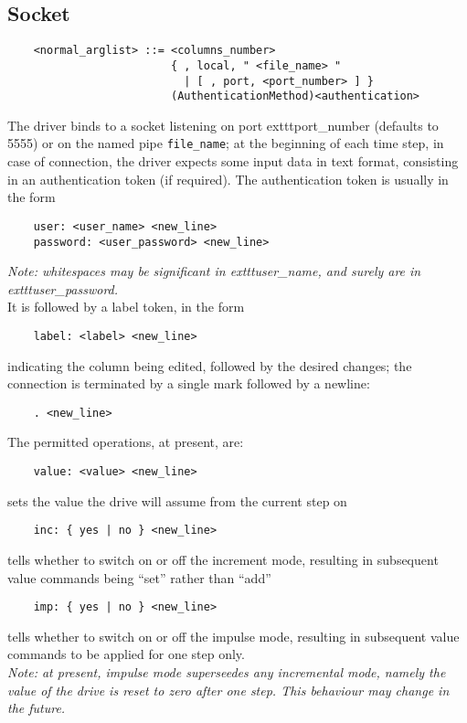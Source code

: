 \subsection{Socket}
\begin{verbatim}
    <normal_arglist> ::= <columns_number>
                         { , local, " <file_name> " 
                           | [ , port, <port_number> ] }
                         (AuthenticationMethod)<authentication>
\end{verbatim}
The driver binds to a socket listening on port 	exttt{port\_number} 
(defaults to 5555) or on the named pipe \texttt{file\_name}; at the
beginning of each time step, in case of connection, the driver expects some
input data in text format, consisting in an authentication token 
(if required).
The authentication token is usually in the form
\begin{verbatim}
    user: <user_name> <new_line>
    password: <user_password> <new_line>
\end{verbatim}
{\em 
    Note: whitespaces may be significant in 	exttt{user\_name}, and surely are
    in 	exttt{user\_password}.
} \\    
It is followed by a label token, in the form
\begin{verbatim}
    label: <label> <new_line>
\end{verbatim}
indicating the column being edited, followed by the desired changes; 
the connection is terminated by a single mark followed by a newline:
\begin{verbatim}
    . <new_line>
\end{verbatim}
The permitted operations, at present, are:
\begin{verbatim}
    value: <value> <new_line>
\end{verbatim}
sets the value the drive will assume from the current step on
\begin{verbatim}
    inc: { yes | no } <new_line>
\end{verbatim}
tells whether to switch on or off the increment mode, resulting in
subsequent value commands being ``set'' rather than ``add''
\begin{verbatim}
    imp: { yes | no } <new_line>
\end{verbatim}
tells whether to switch on or off the impulse mode, resulting in subsequent
value commands to be applied for one step only. \\
{\em 
    Note: at present, impulse mode superseedes any incremental mode, namely
    the value of the drive is reset to zero after one step.
    This behaviour may change in the future.
}

